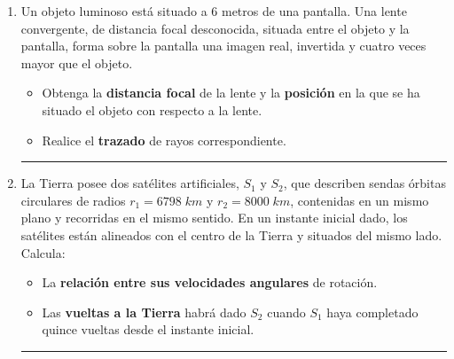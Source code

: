 \documentclass[a4paper,12pt]{exam}
\newcommand{\halmos}{\vspace*{-7mm}
	
					\begin{flushright}
						\rule{1mm}{2.5mm} 
					\end{flushright}\vspace*{-6mm}
						
					  }
\renewcommand{\qed}{\halmos}
\begin{document}
\newpage
{}

\vspace*{.1cm}


\begin{enumerate}

		\item Un objeto luminoso está situado a $6$ metros de una pantalla. Una lente convergente, de  distancia  focal  desconocida,  situada  entre  el  objeto  y  la  pantalla,  forma  sobre  la  pantalla  una  imagen real, invertida y cuatro veces mayor que el objeto.
	\begin{itemize}
		\item[a)] Obtenga la \textbf{distancia focal} de la lente y la \textbf{posición} en la que se ha situado el objeto con respecto a la lente.
		\item[b)] Realice el \textbf{trazado} de rayos correspondiente.
	\end{itemize}
	\qed	
	
		
	
 			
% 			



	\item La  Tierra posee dos satélites artificiales, $S_1$ y $S_2$, que describen sendas órbitas circulares de radios $r_1=6798 \;km$ y $r_2=8000\;km$, contenidas en un mismo plano y recorridas en el mismo sentido. En un instante inicial dado, los satélites están alineados con el centro de la Tierra y situados del mismo lado. Calcula:
 		\begin{itemize}
 			\item[a)] La \textbf{relación entre sus velocidades angulares} de rotación.
 			\item[b)] Las \textbf{vueltas a la Tierra} habrá dado $S_2$ cuando $S_1$ haya completado quince vueltas desde el instante inicial.
 		\end{itemize}
 		\qed
 		

\end{enumerate}
\end{document}
